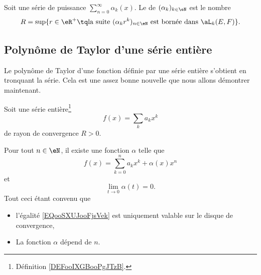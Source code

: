 \begin{definition}	\label{DEFooCAWCooWHLpwl}
	Soit une série de puissance \( \sum_{n=0}^{\infty}\alpha_k(x)\). Le  de \( (\alpha_k)_{k\in \eN}\) est le nombre
	\begin{equation}
		R=\sup\{ r\in \eR^+\tq \text{la suite \( (\alpha_kr^k)_{n\in \eN}\) est bornée dans \( \aL_k(E,F)\)} \}.
	\end{equation}
\end{definition}


\subsection{Polynôme de Taylor d'une série entière}

Le polynôme de Taylor d'une fonction définie par une série entière s'obtient en tronquant la série. Cela est une assez bonne nouvelle que nous allons démontrer maintenant.

\begin{proposition}      \label{PROPooQLHNooRsBYbe}
	Soit une série entière\footnote{Définition \ref{DEFooIXGBooPgJTzB}.}
	\begin{equation}
		f(x)=\sum_ka_kx^k
	\end{equation}
	de rayon de convergence \( R>0\).

	Pour tout \( n\in \eN\), il existe une fonction \( \alpha\) telle que
	\begin{equation}    \label{EQooSXUJooFjsVek}
		f(x)=\sum_{k=0}^na_kx^k+\alpha(x)x^n
	\end{equation}
	et
	\begin{equation}
		\lim_{t\to 0} \alpha(t)=0.
	\end{equation}
	Tout ceci étant convenu que
	\begin{itemize}
		\item
		      l'égalité \eqref{EQooSXUJooFjsVek} est uniquement valable sur le disque de convergence,
		\item La fonction \( \alpha\) dépend de \( n\).
	\end{itemize}
\end{proposition}

